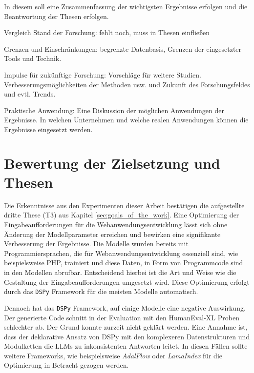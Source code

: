 In diesem soll eine Zusammenfassung der wichtigsten Ergebnisse erfolgen und die Beantwortung der Thesen erfolgen.

Vergleich Stand der Forschung: fehlt noch, muss in Thesen einfließen

Grenzen und Einschränkungen: begrenzte Datenbasis, Grenzen der eingesetzter Tools und Technik.

Impulse für zukünftige Forschung: Vorschläge für weitere Studien. Verbesserungsmöglichkeiten der Methoden usw. und Zukunft des Forschungsfeldes und evtl. Trends.

Praktische Anwendung: Eine Diskussion der möglichen Anwendungen der Ergebnisse. In welchen Unternehmen und welche realen Anwendungen können die Ergebnisse eingesetzt werden.

\section{Bewertung der Zielsetzung und Thesen}
Die Erkenntnisse aus den Experimenten dieser Arbeit bestätigen die aufgestellte dritte These (T3) aus Kapitel \ref{sec:goals_of_the_work}. Eine Optimierung der Eingabeaufforderungen für die Webanwendungsentwicklung lässt sich ohne Änderung der Modellparameter erreichen und bewirken eine signifikante Verbesserung der Ergebnisse. Die Modelle wurden bereits mit Programmiersprachen, die für Webanwendungsentwicklung essenziell sind, wie beispielsweise PHP, trainiert und diese Daten, in Form von Programmcode sind in den Modellen abrufbar. Entscheidend hierbei ist die Art und Weise wie die Gestaltung der Eingabeaufforderungen umgesetzt wird. Diese Optimierung erfolgt durch das \texttt{DSPy} Framework für die meisten Modelle automatisch.\vspace{0.2cm}

Dennoch hat das \texttt{DSPy} Framework, auf einige Modelle eine negative Auswirkung. Der generierte Code schnitt in der Evaluation mit den HumanEval-XL Proben schlechter ab. Der Grund konnte zurzeit nicht geklärt werden. Eine Annahme ist, dass der deklarative Ansatz von DSPy mit den komplexeren Datenstrukturen und Modulketten die LLMs zu inkonsistenten Antworten leitet. In diesen Fällen sollte weitere Frameworks, wie beispielsweise \textit{AdalFlow} oder \textit{LamaIndex} für die Optimierung in Betracht gezogen werden.\vspace{0.2cm}

